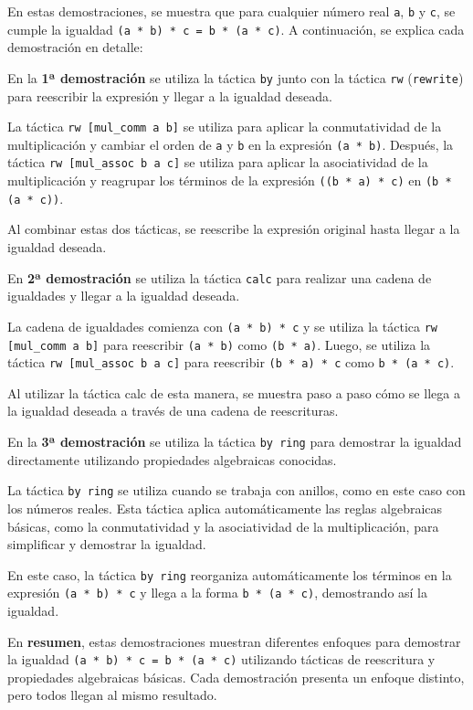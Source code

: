 En estas demostraciones, se muestra que para cualquier número real \texttt{a}, \texttt{b}
y \texttt{c}, se cumple la igualdad \texttt{(a * b) * c = b * (a * c)}. A continuación, se
explica cada demostración en detalle:

En la \textbf{1ª demostración} se utiliza la táctica \texttt{by} junto con la táctica \texttt{rw}
(\texttt{rewrite}) para reescribir la expresión y llegar a la igualdad deseada.

La táctica \texttt{rw [mul\_comm a b]} se utiliza para aplicar la conmutatividad
de la multiplicación y cambiar el orden de \texttt{a} y \texttt{b} en la expresión
\texttt{(a * b)}. Después, la táctica \texttt{rw [mul\_assoc b a c]} se utiliza para aplicar la
asociatividad de la multiplicación y reagrupar los términos de la
expresión \texttt{((b * a) * c)} en \texttt{(b * (a * c))}.

Al combinar estas dos tácticas, se reescribe la expresión original hasta
llegar a la igualdad deseada.

En \textbf{2ª demostración} se utiliza la táctica \texttt{calc} para realizar una
cadena de igualdades y llegar a la igualdad deseada.

La cadena de igualdades comienza con \texttt{(a * b) * c} y se utiliza la táctica
\texttt{rw [mul\_comm a b]} para reescribir \texttt{(a * b)} como \texttt{(b * a)}. Luego, se
utiliza la táctica \texttt{rw [mul\_assoc b a c]} para reescribir \texttt{(b * a) * c} como
\texttt{b * (a * c)}.

Al utilizar la táctica calc de esta manera, se muestra paso a paso cómo
se llega a la igualdad deseada a través de una cadena de reescrituras.

En la \textbf{3ª demostración} se utiliza la táctica \texttt{by ring} para demostrar
la igualdad directamente utilizando propiedades algebraicas conocidas.

La táctica \texttt{by ring} se utiliza cuando se trabaja con anillos, como en
este caso con los números reales. Esta táctica aplica automáticamente
las reglas algebraicas básicas, como la conmutatividad y la
asociatividad de la multiplicación, para simplificar y demostrar la
igualdad.

En este caso, la táctica \texttt{by ring} reorganiza automáticamente los términos
en la expresión \texttt{(a * b) * c} y llega a la forma \texttt{b * (a * c)}, demostrando
así la igualdad.

En \textbf{resumen}, estas demostraciones muestran diferentes enfoques para
demostrar la igualdad \texttt{(a * b) * c = b * (a * c)} utilizando tácticas de
reescritura y propiedades algebraicas básicas. Cada demostración
presenta un enfoque distinto, pero todos llegan al mismo resultado.
